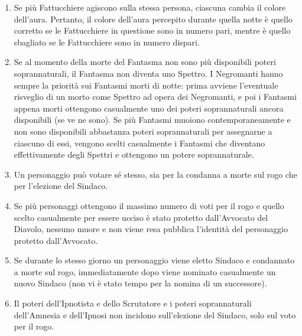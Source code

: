 \documentclass[a4paper,10pt]{article}
\begin{document}
\begin{enumerate}
 \item Se più Fattucchiere agiscono sulla stessa persona, ciascuna cambia il colore dell'aura. Pertanto, il colore dell'aura percepito durante quella notte è quello corretto se le Fattucchiere in questione sono in numero pari, mentre è quello sbagliato se le Fattucchiere sono in numero dispari.
 
 \item Se al momento della morte del Fantasma non sono più disponibili poteri soprannaturali, il Fantasma non diventa uno Spettro.
 I Negromanti hanno sempre la priorità sui Fantasmi morti di notte: prima avviene l'eventuale risveglio di un morto come Spettro ad opera dei Negromanti, e poi i Fantasmi appena morti ottengono casualmente uno dei poteri
soprannaturali ancora disponibili (se ve ne sono).
 Se più Fantasmi muoiono contemporaneamente e non sono disponibili abbastanza poteri soprannaturali per assegnarne a ciascuno di essi, vengono scelti casualmente i Fantasmi che diventano effettivamente degli Spettri e ottengono un potere soprannaturale.
 
 \item Un personaggio può votare sé stesso, sia per la condanna a morte sul rogo che per l'elezione del Sindaco.
 
 \item Se più personaggi ottengono il massimo numero di voti per il rogo e quello scelto casualmente per essere ucciso è stato protetto dall'Avvocato del Diavolo, nessuno muore e non viene resa pubblica l'identità del personaggio protetto dall'Avvocato.
 
 \item Se durante lo stesso giorno un personaggio viene eletto Sindaco e condannato a morte sul rogo, immediatamente dopo viene nominato casualmente un nuovo Sindaco (non vi è stato tempo per la nomina di un successore).
 
 \item Il poteri dell'Ipnotista e dello Scrutatore e i poteri soprannaturali dell'Amnesia e dell'Ipnosi non incidono sull'elezione del Sindaco, solo sul voto per il rogo.
 

\end{enumerate}
\end{document}
